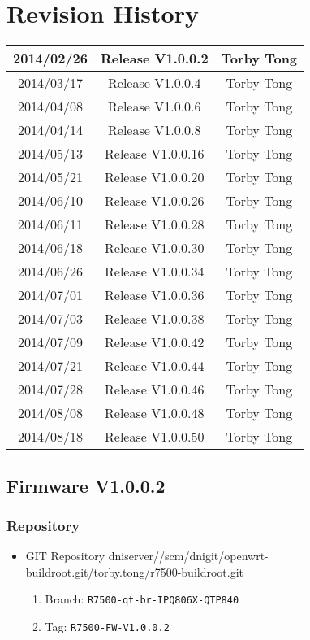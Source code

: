 \documentclass[12pt]{report}
\newcommand{\tlabel}[1]{
  \label{#1}%
  }
\begin{document}
\chapter{Revision History}
\tlabel{sec:revision-history}
   \begin{tabular}{|c|c|c|} \hline
		2014/02/26 & Release V1.0.0.2 & Torby Tong \\ \hline
		2014/03/17 & Release V1.0.0.4 & Torby Tong \\ \hline
		2014/04/08 & Release V1.0.0.6 & Torby Tong \\ \hline
		2014/04/14 & Release V1.0.0.8 & Torby Tong \\ \hline
		2014/05/13 & Release V1.0.0.16 & Torby Tong \\ \hline
		2014/05/21 & Release V1.0.0.20 & Torby Tong \\ \hline
		2014/06/10 & Release V1.0.0.26 & Torby Tong \\ \hline
		2014/06/11 & Release V1.0.0.28 & Torby Tong \\ \hline
		2014/06/18 & Release V1.0.0.30 & Torby Tong \\ \hline
		2014/06/26 & Release V1.0.0.34 & Torby Tong \\ \hline
		2014/07/01 & Release V1.0.0.36 & Torby Tong \\ \hline
		2014/07/03 & Release V1.0.0.38 & Torby Tong \\ \hline
		2014/07/09 & Release V1.0.0.42 & Torby Tong \\ \hline
		2014/07/21 & Release V1.0.0.44 & Torby Tong \\ \hline
		2014/07/28 & Release V1.0.0.46 & Torby Tong \\ \hline
		2014/08/08 & Release V1.0.0.48 & Torby Tong \\ \hline
		2014/08/18 & Release V1.0.0.50 & Torby Tong \\ \hline
   \end{tabular}
			
\section{Firmware V1.0.0.2}

\tlabel{sec:1-0-1}
\subsection{Repository}
\begin{itemize}
\item GIT Repository dniserver//scm/dnigit/openwrt-buildroot.git/torby.tong/r7500-buildroot.git
\begin{enumerate}
    \item Branch: \texttt{R7500-qt-br-IPQ806X-QTP840}
                \item Tag: \texttt{R7500-FW-V1.0.0.2}
    \end{enumerate}
    \end{itemize}
\end{document}

